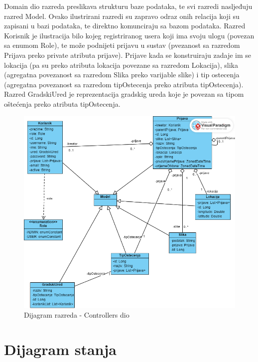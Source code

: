 		\pagebreak
		
		Domain dio razreda preslikava strukturu baze podataka, te svi razredi nasljeđuju razred Model. Ovako ilustrirani razredi su zapravo odraz onih relacija koji su zapisani u bazi podataka, te direktno komunciraju sa bazom podataka. Razred Korisnik je ilustracija bilo kojeg registriranog usera koji ima svoju ulogu (povezan sa enumom Role), te može podnijeti prijavu u sustav (pvezanost sa razredom Prijava preko private atributa prijave). Prijave kada se konstruiraju zadaje im se lokacija (pa su preko atributa lokacija povezane sa razredom Lokacija), slika (agregatna povezanost sa razredom Slika preko varijable slike) i tip ostecenja (agregatna povezanost sa razredom tipOstecenja preko atributa tipOstecenja). Razred GradskiUred je reprezentacija gradskig ureda koje je povezan sa tipom oštećenja preko atributa tipOstecenja. \\
		
		
			\begin{figure}[H]
			\includegraphics[scale=0.3]{slike/domain.PNG} %
			\centering
			\caption{Dijagram razreda - Controllers dio}
			\label{fig:bazapod}
		\end{figure}
			
			
			\eject
		\section{Dijagram stanja}
			
